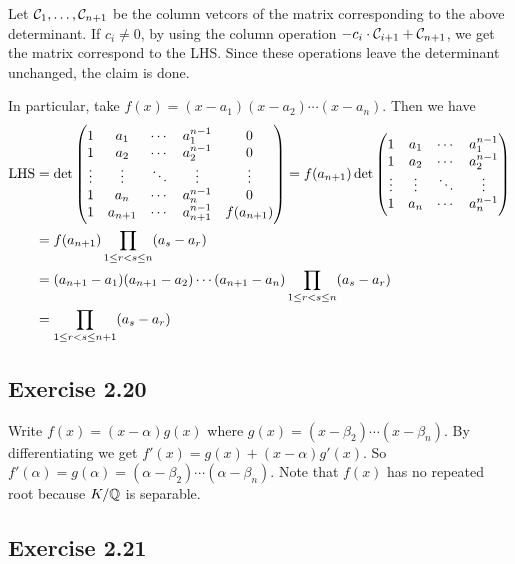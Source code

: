 \documentclass[../Marcus.tex]{subfiles}
\begin{document}
Let $\mathcal{C}_1,\ldots,\mathcal{C}_{n+1}$ be the column vetcors of the matrix corresponding to the above determinant. If $c_i\neq 0$, by using the column operation $-c_i\cdot\mathcal{C}_{i+1}+\mathcal{C}_{n+1}$, we get the matrix correspond to the LHS. Since these operations leave the determinant unchanged, the claim is done.

In particular, take $f(x)=(x-a_1)(x-a_2)\cdots(x-a_n)$. Then we have
$$
\begin{aligned}
    \operatorname{LHS} &= \det\begin{pmatrix}
    1           & a_1        & \cdots & a_1^{n-1}        & 0 \\
    1           & a_2        & \cdots & a_2^{n-1}       & 0 \\
    \vdots & \vdots    & \ddots & \vdots              & \vdots \\
    1           & a_n        & \cdots & a_n^{n-1}        & 0 \\
    1           & a_{n+1} & \cdots & a_{n+1}^{n-1} & f(a_{n+1})
\end{pmatrix}
=
f(a_{n+1})
\det\begin{pmatrix}
    1           & a_1      & \cdots & a_1^{n-1} \\
    1           & a_2     & \cdots & a_2^{n-1} \\
    \vdots & \vdots & \ddots & \vdots \\
    1          & a_n      & \cdots & a_n^{n-1}
\end{pmatrix} \\
    &= f(a_{n+1})\prod_{1\leq r<s\leq n}(a_s-a_r) \\
    &= (a_{n+1}-a_1)(a_{n+1}-a_2)\cdots(a_{n+1}-a_n)\prod_{1\leq r<s\leq n}(a_s-a_r)  \\
    &= \prod_{1\leq r<s\leq n+1}(a_s-a_r)
\end{aligned}
$$

\subsection*{Exercise 2.20}

Write $f(x)=(x-\alpha)g(x)$ where $g(x)=(x-\beta_2)\cdots(x-\beta_n)$. By differentiating we get $f'(x)=g(x)+(x-\alpha)g'(x)$. So $f'(\alpha)=g(\alpha)=(\alpha-\beta_2)\cdots(\alpha-\beta_n)$. Note that $f(x)$ has no repeated root because $K/\mathbb{Q}$ is separable.

\subsection*{Exercise 2.21}
\end{document}
